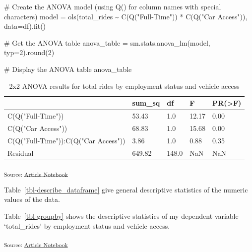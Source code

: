 \documentclass[
  letterpaper,
  DIV=11,
  numbers=noendperiod]{scrartcl}
\newenvironment{Shaded}{\begin{snugshade}}{\end{snugshade}}
\newcommand{\BuiltInTok}[1]{\textcolor[rgb]{0.00,0.23,0.31}{#1}}
\newcommand{\CommentTok}[1]{\textcolor[rgb]{0.37,0.37,0.37}{#1}}
\newcommand{\DecValTok}[1]{\textcolor[rgb]{0.68,0.00,0.00}{#1}}
\newcommand{\NormalTok}[1]{\textcolor[rgb]{0.00,0.23,0.31}{#1}}
\newcommand{\OperatorTok}[1]{\textcolor[rgb]{0.37,0.37,0.37}{#1}}
\newcommand{\StringTok}[1]{\textcolor[rgb]{0.13,0.47,0.30}{#1}}
\begin{document}
\begin{Shaded}
\begin{Highlighting}[]
\CommentTok{\# Create the ANOVA model (using Q() for column names with special characters)}
\NormalTok{model }\OperatorTok{=}\NormalTok{ ols(}\StringTok{\textquotesingle{}total\_rides \textasciitilde{} C(Q("Full{-}Time")) * C(Q("Car Access"))\textquotesingle{}}\NormalTok{, data}\OperatorTok{=}\NormalTok{df).fit()}

\CommentTok{\# Get the ANOVA table}
\NormalTok{anova\_table }\OperatorTok{=}\NormalTok{ sm.stats.anova\_lm(model, typ}\OperatorTok{=}\DecValTok{2}\NormalTok{).}\BuiltInTok{round}\NormalTok{(}\DecValTok{2}\NormalTok{)}

\CommentTok{\# Display the ANOVA table}
\NormalTok{anova\_table}
\end{Highlighting}
\end{Shaded}

{

\begin{longtable}[]{@{}lllll@{}}

\caption{\label{tbl-anova}2x2 ANOVA results for total rides by
employment status and vehicle access}

\tabularnewline

\toprule\noalign{}
& sum\_sq & df & F & PR(\textgreater F) \\
\midrule\noalign{}
\endhead
\bottomrule\noalign{}
\endlastfoot
C(Q("Full-Time")) & 53.43 & 1.0 & 12.17 & 0.00 \\
C(Q("Car Access")) & 68.83 & 1.0 & 15.68 & 0.00 \\
C(Q("Full-Time")):C(Q("Car Access")) & 3.86 & 1.0 & 0.88 & 0.35 \\
Residual & 649.82 & 148.0 & NaN & NaN \\

\end{longtable}

}

\textsubscript{Source:
\href{https://RachelRapier.github.io/psych_755_project/index.qmd.html}{Article
Notebook}}

Table~\ref{tbl-describe_dataframe} give general descriptive statistics
of the numeric values of the data.

Table~\ref{tbl-groupby} shows the descriptive statistics of my dependent
variable `total\_rides' by employment status and vehicle access.

\textsubscript{Source:
\href{https://RachelRapier.github.io/psych_755_project/index.qmd.html}{Article
Notebook}}
\end{document}
